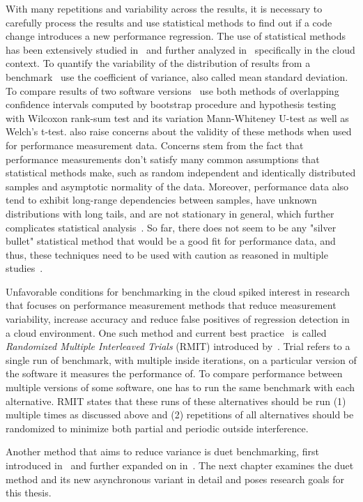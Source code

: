 With many repetitions and variability across the results, it is necessary to carefully process the results and use statistical methods to find out if a code change introduces a new performance regression.
The use of statistical methods has been extensively studied in~\citet{bulej2017stat} and further analyzed in~\citet{laaber2019software} specifically in the cloud context.
To quantify the variability of the distribution of results from a benchmark~\citet{laaber2019software} use the coefficient of variance, also called mean standard deviation.
To compare results of two software versions~\citet{bulej2017stat} use both methods of overlapping confidence intervals computed by bootstrap procedure and hypothesis testing with Wilcoxon rank-sum test and its variation Mann-Whiteney U-test as well as Welch's t-test.
\citet{bulej2017stat} also raise concerns about the validity of these methods when used for performance measurement data.
Concerns stem from the fact that performance measurements don't satisfy many common assumptions that statistical methods make, such as random independent and identically distributed samples and asymptotic normality of the data.
Moreover, performance data also tend to exhibit long-range dependencies between samples, have unknown distributions with long tails, and are not stationary in general, which further complicates statistical analysis~\cite{bulej2017stat}.
So far, there does not seem to be any "silver bullet" statistical method that would be a good fit for performance data, and thus, these techniques need to be used with caution as reasoned in multiple studies~\cite{leitner2016patterns, laaber2019software, bulej2017stat}.

Unfavorable conditions for benchmarking in the cloud spiked interest in research that focuses on performance measurement methods that reduce measurement variability, increase accuracy and reduce false positives of regression detection in a cloud environment.
One such method and current best practice~\cite{laaber2019software} is called \emph{Randomized Multiple Interleaved Trials} (RMIT) introduced by~\citet{abedi2017conducting}.
Trial refers to a single run of benchmark, with multiple inside iterations, on a particular version of the software it measures the performance of.
To compare performance between multiple versions of some software, one has to run the same benchmark with each alternative.
RMIT states that these runs of these alternatives should be run (1) multiple times as discussed above and (2) repetitions of all alternatives should be randomized to minimize both partial and periodic outside interference.

Another method that aims to reduce variance is duet benchmarking, first introduced in~\citet{bulej2019initial} and further expanded on in~\citet{bulej2020duet}.
The next chapter examines the duet method and its new asynchronous variant in detail and poses research goals for this thesis.
